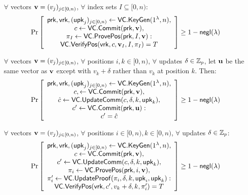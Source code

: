 \begin{definition}
    \label{def:vc:opening-correctness}
    $\forall$ vectors $\bm{\mathrm{v}}=(v_j)_{j\in [0,n)}$, $\forall$ index sets $I\subseteq[0,n)$:
    \begin{align*}
    \Pr \left[ \begin{array}{c}
    \mathsf{prk},\mathsf{vrk},(\mathsf{upk}_j)_{j\in[0,n)}\leftarrow \mathsf{VC}.\mathsf{KeyGen}(1^\lambda, n), \\
    c \leftarrow \mathsf{VC}.\mathsf{Commit}(\mathsf{prk},\bm{\mathrm{v}}),\\
    \pi_I \leftarrow \mathsf{VC}.\mathsf{ProvePos}(\mathsf{prk}, I, \bm{\mathrm{v}}):\\
    \mathsf{VC}.\mathsf{VerifyPos}(\mathsf{vrk}, c, \bm{\mathrm{v}}_I, I, \pi_I) = T
    \end{array} \right] \ge 1 - \mathsf{negl}(\lambda)
    \end{align*}
\end{definition}

\begin{definition}
    $\forall$ vectors $\bm{\mathrm{v}}=(v_j)_{j\in [0,n)}$, $\forall$ positions $i,k\in[0,n)$, $\forall$ updates $\delta\in \mathbb{Z}_p$, let $\bm{\mathrm{u}}$ be the same vector as $\bm{\mathrm{v}}$ except with $v_k+\delta$ rather than $v_k$ at position $k$. Then:\\
    \begin{align*}
    \Pr \left[ \begin{array}{c}
    \mathsf{prk},\mathsf{vrk},(\mathsf{upk}_j)_{j\in[0,n)} \leftarrow \mathsf{VC}.\mathsf{KeyGen}(1^\lambda, n), \\
    c, \leftarrow \mathsf{VC}.\mathsf{Commit}(\mathsf{prk}, \bm{\mathrm{v}}),\\
    \hat{c}\leftarrow \mathsf{VC}.\mathsf{UpdateComm}(c, \delta, k,\mathsf{upk}_k),\\
    c' \leftarrow \mathsf{VC}.\mathsf{Commit}(\mathsf{prk}, \bm{\mathrm{u}}):\\
    c' = \hat{c}
    \end{array} \right] \ge 1 - \mathsf{negl}(\lambda)
    \end{align*}
\end{definition}

\begin{definition}
    $\forall$ vectors $\bm{\mathrm{v}}=(v_j)_{j\in [0,n)}$, $\forall$ positions $i\in[0,n),k\in[0,n)$, $\forall$ updates $\delta \in \mathbb{Z}_p$:
    \begin{align*}
    \Pr \left[ \begin{array}{c}
    \mathsf{prk},\mathsf{vrk},(\mathsf{upk}_j)_{j\in[0,n)} \leftarrow \mathsf{VC}.\mathsf{KeyGen}(1^\lambda, n), \\
    c \leftarrow \mathsf{VC}.\mathsf{Commit}(\mathsf{prk}, \bm{\mathrm{v}}),\\
    c' \leftarrow \mathsf{VC}.\mathsf{UpdateComm}(c, \delta, k,\mathsf{upk}_k),\\
    \pi_i \leftarrow \mathsf{VC}.\mathsf{ProvePos}(\mathsf{prk}, i, \bm{\mathrm{v}}),\\
    \pi'_i \leftarrow \mathsf{VC}.\mathsf{UpdateProof}(\pi_i, \delta, k,\mathsf{upk}_i, \mathsf{upk}_k):\\
    \mathsf{VC}.\mathsf{VerifyPos}(\mathsf{vrk}, c', v_k+\delta, k, \pi'_i) = T
    \end{array} \right] \ge 1 - \mathsf{negl}(\lambda)
    \end{align*}
\end{definition}

